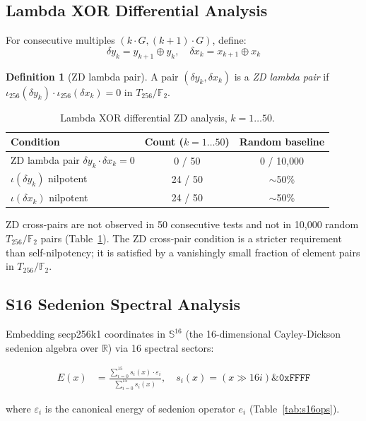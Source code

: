 \documentclass[runningheads]{llncs}
\theoremstyle{plain}
\theoremstyle{definition}
\newtheorem{definition}[theorem]{Definition}
\newcommand{\GFtwo}{\mathbb{F}_2}
\begin{document}
\subsection{Lambda XOR Differential Analysis}

For consecutive multiples $(k \cdot G, (k+1) \cdot G)$, define:
\[
\delta y_k = y_{k+1} \oplus y_k, \quad \delta x_k = x_{k+1} \oplus x_k
\]

\begin{definition}[ZD lambda pair]
A pair $(\delta y_k, \delta x_k)$ is a \emph{ZD lambda pair} if
$\iota_{256}(\delta y_k) \cdot \iota_{256}(\delta x_k) = 0$ in $T_{256}/\GFtwo$.
\end{definition}

\begin{table}[h]
\centering
\caption{Lambda XOR differential ZD analysis, $k=1\ldots 50$.}
\label{tab:lambda}
\begin{tabular}{lcc}
\toprule
Condition & Count ($k=1\ldots 50$) & Random baseline \\
\midrule
ZD lambda pair $\delta y_k \cdot \delta x_k = 0$ & 0 / 50 & 0 / 10{,}000 \\
$\iota(\delta y_k)$ nilpotent & 24 / 50 & $\sim$50\% \\
$\iota(\delta x_k)$ nilpotent & 24 / 50 & $\sim$50\% \\
\bottomrule
\end{tabular}
\end{table}

ZD cross-pairs are not observed in 50 consecutive tests and not in 10,000
random $T_{256}/\GFtwo$ pairs (Table~\ref{tab:lambda}). The ZD cross-pair
condition is a stricter requirement than self-nilpotency; it is satisfied by
a vanishingly small fraction of element pairs in $T_{256}/\GFtwo$.

\subsection{S16 Sedenion Spectral Analysis}

Embedding secp256k1 coordinates in $\mathbb{S}^{16}$ (the 16-dimensional
Cayley-Dickson sedenion algebra over $\mathbb{R}$) via 16 spectral sectors:

\begin{align*}
E(x) &= \frac{\sum_{i=0}^{15} s_i(x) \cdot \varepsilon_i}{\sum_{i=0}^{15} s_i(x)}, \quad
s_i(x) = (x \gg 16i) \mathbin{\&} \mathtt{0xFFFF}
\end{align*}

where $\varepsilon_i$ is the canonical energy of sedenion operator $e_i$
(Table~\ref{tab:s16ops}).
\end{document}
